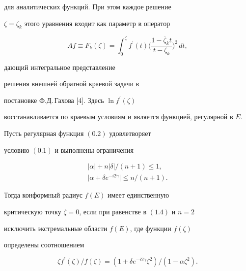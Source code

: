 для аналитических функций. При этом каждое решение


$\zeta=\zeta_k$ этого уравнения входит как параметр в оператор


\begin{equation}


Af\equiv


F_k(\zeta)=\int_0^\zeta{f^\prime(t)\bigg(\frac{1-\overline\zeta_k


t}{t-\zeta_k}\bigg)^2}\,dt,


\end{equation}


дающий интегральное представление


решения внешней обратной краевой задачи в


постановке Ф.Д.\,Гахова [4]. Здесь $\ln f^\prime(\zeta)$


восстанавливается по краевым условиям и является функцией, регулярной в $E$.





\begin{thm}


Пусть регулярная функция $(0.2)$ удовлетворяет


условию $(0.1)$ и выполнены ограничения


\begin{gather}


{| \alpha |} + n{| \delta |}/(n+1) \le 1,\\


%


{|{\alpha+\delta e^{-i2 \gamma}|}}\le n/(n+1).


\end{gather}


Тогда конформный радиус $f(E)$ имеет единственную


критическую точку $\zeta=0$, если при равенстве в $(1.4)$ и $n=2$


исключить экстремальные области $f(E)$, где функции $f(\zeta)$


определены соотношением


$$


\zeta f^\prime(\zeta)/f(\zeta)=(1+\delta e^{-i2\gamma}


\zeta^2)/(1-\alpha \zeta^2).


$$


\end{thm}





